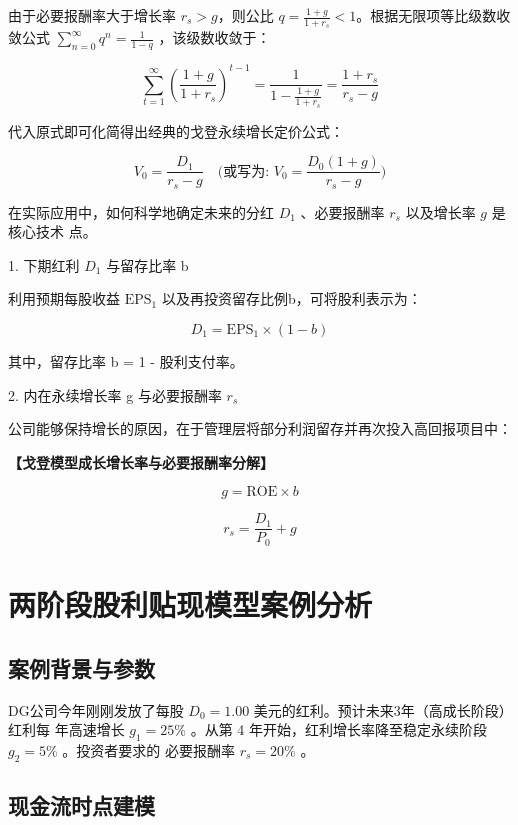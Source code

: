 \documentclass[lang=cn,10pt,color=blue]{elegantbook}
\begin{document}
由于必要报酬率大于增长率 $r_s > g$，则公比 $q = \frac{1 + g}{1 + r_s} < 1$。根据无限项等比级数收敛公式 $\textstyle \sum _ { n = 0 } ^ { \infty } q ^ { n } = { \frac { 1 } { 1 - q } }$ ，该级数收敛于： 

$$
\sum_ {t = 1} ^ {\infty} \left(\frac {1 + g}{1 + r _ {s}}\right) ^ {t - 1} = \frac {1}{1 - \frac {1 + g}{1 + r _ {s}}} = \frac {1 + r _ {s}}{r _ {s} - g}
$$

代入原式即可化简得出经典的戈登永续增长定价公式： 

$$
\boxed {V _ {0} = \frac {D _ {1}}{r _ {s} - g}} \quad \text {(或写为: } \boxed {V _ {0} = \frac {D _ {0} (1 + g)}{r _ {s} - g}} \text {)}
$$

在实际应用中，如何科学地确定未来的分红 $D _ { 1 }$ 、必要报酬率 $r _ { s }$ 以及增长率 $g$ 是核心技术 点。 

1. 下期红利 $D _ { 1 }$ 与留存比率 b 

利用预期每股收益 $\mathrm { E P S _ { 1 } }$ 以及再投资留存比例b，可将股利表示为： 

$$
D _ {1} = \mathrm{EPS} _ {1} \times (1 - b)
$$

其中，留存比率 b = 1 - 股利支付率。 

2. 内在永续增长率 g 与必要报酬率 $r _ { s }$ 

公司能够保持增长的原因，在于管理层将部分利润留存并再次投入高回报项目中： 

\textbf{\color{UnivColor} 【戈登模型成长增长率与必要报酬率分解】} 

$$
\boxed {g = \mathrm {R O E} \times b}
$$

$$
\boxed {r _ {s} = \frac {D _ {1}}{P _ {0}} + g}
$$

\section{两阶段股利贴现模型案例分析}

\subsection{案例背景与参数}

DG公司今年刚刚发放了每股 $D _ { 0 } = 1 . 0 0$ 美元的红利。预计未来3年（高成长阶段）红利每 年高速增长 $g _ { 1 } = 2 5 \%$ 。从第 4 年开始，红利增长率降至稳定永续阶段 $g _ { 2 } = 5 \%$ 。投资者要求的 必要报酬率 $r _ { s } = 2 0 \%$ 。 

\subsection{现金流时点建模}
\end{document}
